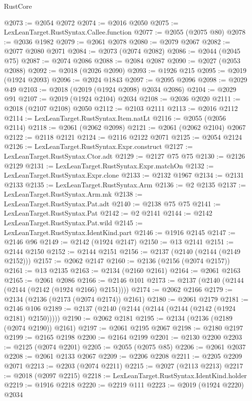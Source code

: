 \begin{lexlean}{RustCore}
\begin{coremodule}
@2073 := @2054 @2072
@2074 := @2016 @2050
@2075 := LexLeanTarget.RustSyntax.Callee.function
@2077 := @2055 (@2075 @80)
@2078 := @2036 @1982
@2079 := @2061 @2078
@2080 := @2079 @2067
@2082 := @2077 @2080 @2071
@2084 := @2073 (@2074 @2082)
@2086 := @2044 (@2045 @75)
@2087 := @2074 @2086
@2088 := @2084 @2087
@2090 := @2027 (@2053 @2088)
@2092 := @2018 (@2026 @2090)
@2093 := @1926 @215
@2095 := @2019 (@1924 @2093)
@2096 := @2024 @1843
@2097 := @2095 @2096
@2098 := @2029 @49
@2103 := @2018 (@2019 (@1924 @2098) @2034 @2086)
@2104 := @2029 @91
@2107 := @2019 (@1924 @2104) @2034
@2108 := @2036 @2020
@2111 := @2018 (@2107 @2108) @2050
@2112 := @2103 @2111
@2113 := @2016 @2112
@2114 := LexLeanTarget.RustSyntax.Item.natLt
@2116 := @2055 (@2056 @2114)
@2118 := @2061 (@2062 @2098)
@2121 := @2061 (@2062 @2104) @2067
@2122 := @2118 @2121
@2124 := @2116 @2122 @2071
@2125 := @2054 @2124
@2126 := LexLeanTarget.RustSyntax.Expr.construct
@2127 := LexLeanTarget.RustSyntax.Ctor.adt
@2129 := @2127 @75 @75
@2130 := @2126 @2129
@2131 := LexLeanTarget.RustSyntax.Expr.matchOn
@2132 := LexLeanTarget.RustSyntax.Expr.clone
@2133 := @2132 @1967
@2134 := @2131 @2133
@2135 := LexLeanTarget.RustSyntax.Arm
@2136 := @2 @2135
@2137 := LexLeanTarget.RustSyntax.Arm.mk
@2138 := LexLeanTarget.RustSyntax.Pat.adt
@2140 := @2138 @75 @75
@2141 := LexLeanTarget.RustSyntax.Pat
@2142 := @2 @2141
@2144 := @2142 LexLeanTarget.RustSyntax.Pat.wild
@2145 := LexLeanTarget.RustSyntax.IdentKind.part
@2146 := @1916 @2145
@2147 := @2146 @96
@2149 := @2142 (@1924 @2147)
@2150 := @13 @2141
@2151 := @2144 @2150
@2152 := @2144 @2151
@2156 := @2137 (@2140 (@2144 (@2149 @2152)))
@2157 := @2062 @2147
@2160 := @2136 (@2156 (@2074 @2157))
@2161 := @13 @2135
@2163 := @2134 (@2160 @2161)
@2164 := @2061 @2163
@2165 := @2061 @2086
@2166 := @2146 @101
@2173 := @2137 (@2140 (@2144 (@2144 (@2142 (@1924 @2166) @2151))))
@2174 := @2062 @2166
@2179 := @2134 (@2136 (@2173 (@2074 @2174)) @2161)
@2180 := @2061 @2179
@2181 := @2146 @106
@2189 := @2137 (@2140 (@2144 (@2144 (@2144 (@2142 (@1924 @2181) @2150)))))
@2190 := @2062 @2181
@2195 := @2134 (@2136 (@2189 (@2074 @2190)) @2161)
@2197 := @2061 @2195 @2067
@2198 := @2180 @2197
@2199 := @2165 @2198
@2200 := @2164 @2199
@2201 := @2130 @2200
@2203 := @2125 (@2074 @2201)
@2205 := @2055 (@2075 @85)
@2206 := @2061 @2037
@2208 := @2061 @2133 @2067
@2209 := @2206 @2208
@2211 := @2205 @2209 @2071
@2213 := @2203 (@2074 @2211)
@2215 := @2027 (@2113 @2213)
@2217 := @2018 (@2097 @2215)
@2218 := LexLeanTarget.RustSyntax.IdentKind.holder
@2219 := @1916 @2218
@2220 := @2219 @111
@2223 := @2019 (@1924 @2220) @2034

\end{coremodule}
\end{lexlean}
